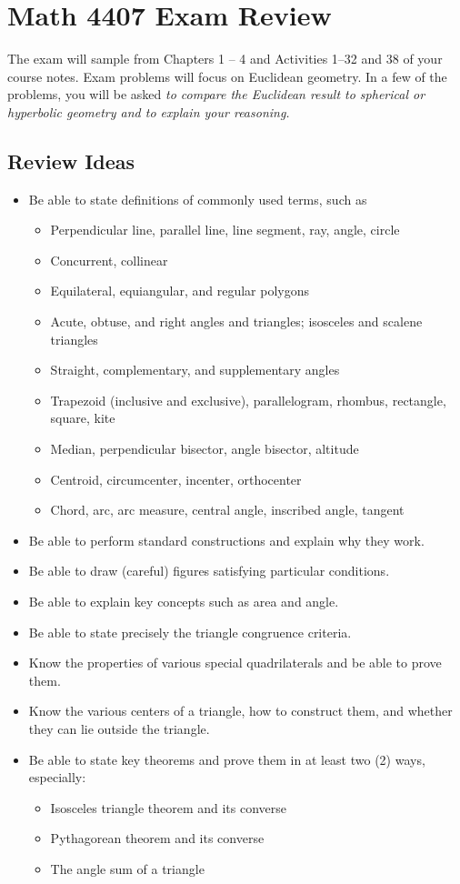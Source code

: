 \newpage

\section{Math 4407 Exam Review}
The exam will sample from Chapters 1 -- 4 and Activities 1--32 and 38 of your course notes.  Exam problems will focus on Euclidean geometry.  In a few of the problems, you will be asked \emph{to compare the Euclidean result to spherical or hyperbolic geometry and to explain your reasoning.}  
\subsection{Review Ideas}

\begin{itemize}\itemsep0em
\item Be able to state definitions of commonly used terms, such as 
\begin{itemize}
\item Perpendicular line, parallel line, line segment, ray, angle, circle
\item Concurrent, collinear
\item Equilateral, equiangular, and regular polygons
\item Acute, obtuse, and right angles and triangles; isosceles and scalene triangles
\item Straight, complementary, and supplementary angles
\item Trapezoid (inclusive and exclusive), parallelogram, rhombus, rectangle, square, kite
\item Median, perpendicular bisector, angle bisector, altitude
\item Centroid, circumcenter, incenter, orthocenter
\item Chord, arc, arc measure, central angle, inscribed angle, tangent
\end{itemize}
\item Be able to perform standard constructions and explain why they work. 
\item Be able to draw (careful) figures satisfying particular conditions.  
\item Be able to explain key concepts such as area and angle.   
\item Be able to state precisely the triangle congruence criteria. 
\item Know the properties of various special quadrilaterals and be able to prove them.  
\item Know the various centers of a triangle, how to construct them, and whether they can lie outside the triangle.  
\item Be able to state key theorems and prove them in at least two (2) ways, especially:  
\begin{itemize}
\item Isosceles triangle theorem and its converse
\item Pythagorean theorem and its converse
\item The angle sum of a triangle 
\end{itemize}


\end{itemize}
